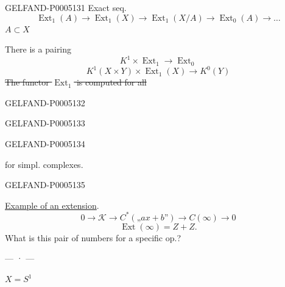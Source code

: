 \begin{GelfandAdjacentEvidence}{GELFAND-P000513}{1}
 Exact seq.
\[
\operatorname{Ext}_1(A)\to\operatorname{Ext}_1(X)\to
\operatorname{Ext}_1(X/A)\to\operatorname{Ext}_0(A)\to\ldots
\]
$A\subset X$

 There is a pairing
\[
K^1\times\operatorname{Ext}_1\to\operatorname{Ext}_0
\]
\[
K^1(X\times Y)\times\operatorname{Ext}_1(X)\to K^0(Y)
\]
\sout{The functor \mbox{$\operatorname{Ext}_1$} is computed for all}
\end{GelfandAdjacentEvidence}
\begin{GelfandAdjacentEvidence}{GELFAND-P000513}{2}

\end{GelfandAdjacentEvidence}
\begin{GelfandAdjacentEvidence}{GELFAND-P000513}{3}


\end{GelfandAdjacentEvidence}
\begin{GelfandAdjacentEvidence}{GELFAND-P000513}{4}

for simpl. complexes.
\end{GelfandAdjacentEvidence}
\begin{GelfandAdjacentEvidence}{GELFAND-P000513}{5}


\uline{Example of an extension}.
\[
0\to\mathcal K\to C^*(\text{„}ax+b\text{”})\to C(\infty)\to0
\]
\[
\operatorname{Ext}(\infty)=Z+Z.
\]
What is this pair of numbers for a specific op.?

\begin{center}— · —\end{center}
\sout{\mbox{$X=S^1$}}
\end{GelfandAdjacentEvidence}

